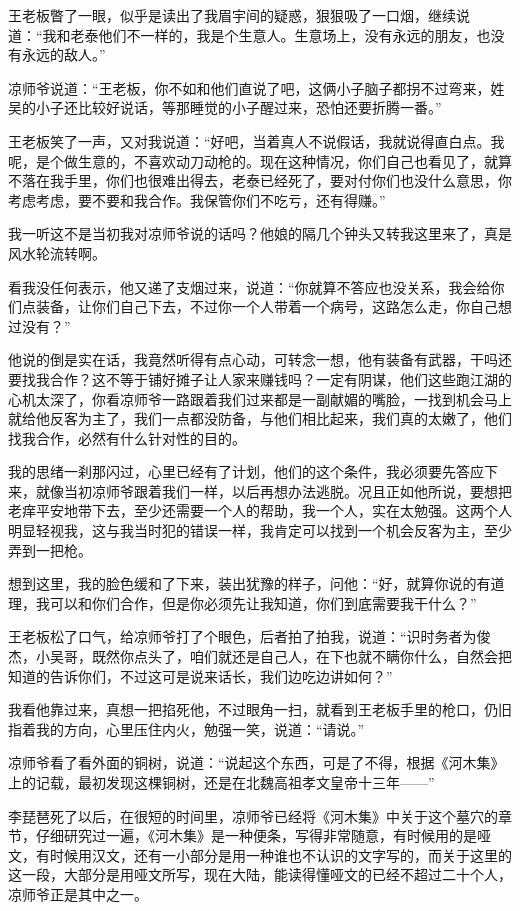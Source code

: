 王老板瞥了一眼，似乎是读出了我眉宇间的疑惑，狠狠吸了一口烟，继续说道：“我和老泰他们不一样的，我是个生意人。生意场上，没有永远的朋友，也没有永远的敌人。”

凉师爷说道：“王老板，你不如和他们直说了吧，这俩小子脑子都拐不过弯来，姓吴的小子还比较好说话，等那睡觉的小子醒过来，恐怕还要折腾一番。”

王老板笑了一声，又对我说道：“好吧，当着真人不说假话，我就说得直白点。我呢，是个做生意的，不喜欢动刀动枪的。现在这种情况，你们自己也看见了，就算不落在我手里，你们也很难出得去，老泰已经死了，要对付你们也没什么意思，你考虑考虑，要不要和我合作。我保管你们不吃亏，还有得赚。”

我一听这不是当初我对凉师爷说的话吗？他娘的隔几个钟头又转我这里来了，真是风水轮流转啊。

看我没任何表示，他又递了支烟过来，说道：“你就算不答应也没关系，我会给你们点装备，让你们自己下去，不过你一个人带着一个病号，这路怎么走，你自己想过没有？”

他说的倒是实在话，我竟然听得有点心动，可转念一想，他有装备有武器，干吗还要找我合作？这不等于铺好摊子让人家来赚钱吗？一定有阴谋，他们这些跑江湖的心机太深了，你看凉师爷一路跟着我们过来都是一副献媚的嘴脸，一找到机会马上就给他反客为主了，我们一点都没防备，与他们相比起来，我们真的太嫩了，他们找我合作，必然有什么针对性的目的。

我的思绪一刹那闪过，心里已经有了计划，他们的这个条件，我必须要先答应下来，就像当初凉师爷跟着我们一样，以后再想办法逃脱。况且正如他所说，要想把老痒平安地带下去，至少还需要一个人的帮助，我一个人，实在太勉强。这两个人明显轻视我，这与我当时犯的错误一样，我肯定可以找到一个机会反客为主，至少弄到一把枪。

想到这里，我的脸色缓和了下来，装出犹豫的样子，问他：“好，就算你说的有道理，我可以和你们合作，但是你必须先让我知道，你们到底需要我干什么？”

王老板松了口气，给凉师爷打了个眼色，后者拍了拍我，说道：“识时务者为俊杰，小吴哥，既然你点头了，咱们就还是自己人，在下也就不瞒你什么，自然会把知道的告诉你们，不过这可是说来话长，我们边吃边讲如何？”

我看他靠过来，真想一把掐死他，不过眼角一扫，就看到王老板手里的枪口，仍旧指着我的方向，心里压住内火，勉强一笑，说道：“请说。”

凉师爷看了看外面的铜树，说道：“说起这个东西，可是了不得，根据《河木集》上的记载，最初发现这棵铜树，还是在北魏高祖孝文皇帝十三年——”

李琵琶死了以后，在很短的时间里，凉师爷已经将《河木集》中关于这个墓穴的章节，仔细研究过一遍，《河木集》是一种便条，写得非常随意，有时候用的是哑文，有时候用汉文，还有一小部分是用一种谁也不认识的文字写的，而关于这里的这一段，大部分是用哑文所写，现在大陆，能读得懂哑文的已经不超过二十个人，凉师爷正是其中之一。

